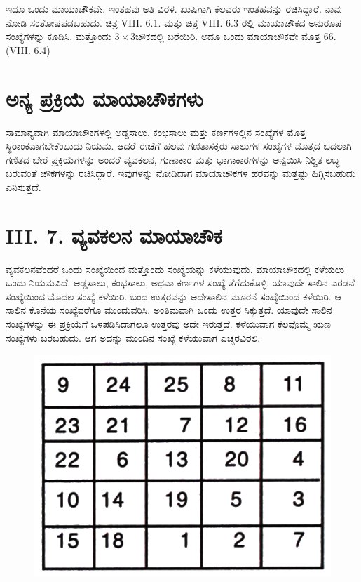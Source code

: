 ಇದೂ ಒಂದು ಮಾಯಾಚೌಕವೇ. ಇಂತಹವು ಅತಿ ವಿರಳ. ಖುಷಿಗಾಗಿ ಕೆಲವರು ಇಂತಹವನ್ನು ರಚಿಸಿದ್ದಾರೆ. ನಾವು ನೋಡಿ ಸಂತೋಷಪಡಬಹುದು. ಚಿತ್ರ VIII. 6.1. ಮತ್ತು ಚಿತ್ರ VIII. 6.3 ರಲ್ಲಿ ಮಾಯಾಚೌಕದ ಅನುರೂಪ ಸಂಖ್ಯೆಗಳನ್ನು ಕೂಡಿಸಿ. ಮತ್ತೊಂದು $3 \times 3$ಚೌಕದಲ್ಲಿ ಬರೆಯಿರಿ. ಅದೂ ಒಂದು ಮಾಯಾಚೌಕವೇ ಮೊತ್ತ 66. (VIII. 6.4)

\section*{ಅನ್ಯ ಪ್ರಕ್ರಿಯೆ ಮಾಯಾಚೌಕಗಳು}

ಸಾಮಾನ್ಯವಾಗಿ ಮಾಯಾಚೌಕಗಳಲ್ಲಿ ಅಡ್ಡಸಾಲು, ಕಂಭಸಾಲು ಮತ್ತು ಕರ್ಣಗಳಲ್ಲಿನ ಸಂಖ್ಯೆಗಳ ಮೊತ್ತ ಸ್ಥಿರಾಂಕವಾಗಬೇಕೆಂಬುದು ನಿಯಮ. ಆದರೆ ಈಚೆಗೆ ಹಲವು ಗಣಿತಾಸಕ್ತರು ಸಾಲುಗಳ ಸಂಖ್ಯೆಗಳ ಮೊತ್ತದ ಬದಲಾಗಿ ಗಣಿತದ ಬೇರೆ ಪ್ರಕ್ರಿಯೆಗಳನ್ನು ಅಂದರೆ ವ್ಯವಕಲನ, ಗುಣಾಕಾರ ಮತ್ತು ಭಾಗಾಕಾರಗಳನ್ನು ಅನ್ವಯಿಸಿ ನಿಶ್ಚಿತ ಲಬ್ಧ ಬರುವಂತೆ ಚೌಕಗಳನ್ನು ರಚಿಸಿದ್ದಾರೆ. ಇವುಗಳನ್ನು ನೋಡಿದಾಗ ಮಾಯಾಚೌಕಗಳ ಹರವನ್ನು ಮತ್ತಷ್ಟು ಹಿಗ್ಗಿಸಬಹುದು ಎನಿಸುತ್ತದೆ.

\section*{ III. 7. ವ್ಯವಕಲನ ಮಾಯಾಚೌಕ}

ವ್ಯವಕಲನವೆಂದರೆ ಒಂದು ಸಂಖ್ಯೆಯಿಂದ ಮತ್ತೊಂದು ಸಂಖ್ಯೆಯನ್ನು ಕಳೆಯುವುದು. ಮಾಯಾಚೌಕದಲ್ಲಿ ಕಳೆಯಲು ಒಂದು ನಿಯಮವಿದೆ. ಅಡ್ಡಸಾಲು, ಕಂಭಸಾಲು, ಅಥವಾ ಕರ್ಣಗಳ ಸಂಖ್ಯೆ ತೆಗೆದುಕೊಳ್ಳಿ. ಯಾವುದೇ ಸಾಲಿನ ಎರಡನೆ ಸಂಖ್ಯೆಯಿಂದ ಮೊದಲ ಸಂಖ್ಯೆ ಕಳೆಯಿರಿ. ಬಂದ ಉತ್ತರವನ್ನು ಅದೇಸಾಲಿನ ಮೂರನೆ ಸಂಖ್ಯೆಯಿಂದ ಕಳೆಯಿರಿ. ಆ ಸಾಲಿನ ಕೊನೆಯ ಸಂಖ್ಯೆವರೆಗೂ ಮುಂದುವರಿಸಿ. ಅಂತಿಮವಾಗಿ ಒಂದು ಉತ್ತರ ಸಿಕ್ಕುತ್ತದೆ. ಯಾವುದೇ ಸಾಲಿನ ಸಂಖ್ಯೆಗಳನ್ನು ಈ ಪ್ರಕ್ರಿಯೆಗೆ ಒಳಪಡಿಸಿದಾಗಲೂ ಉತ್ತರವು ಅದೇ ಇರುತ್ತದೆ. ಕಳೆಯುವಾಗ ಕೆಲವೊಮ್ಮೆ ಋಣ ಸಂಖ್ಯೆಗಳು ಬರಬಹುದು. ಆಗ ಅದನ್ನು ಮುಂದಿನ ಸಂಖ್ಯೆ ಕಳೆಯುವಾಗ ಎಚ್ಚರವಿರಲಿ.
\begin{figure}[H]
\includegraphics{src/figures/chap7/fig7-24.jpg}
\end{figure}

